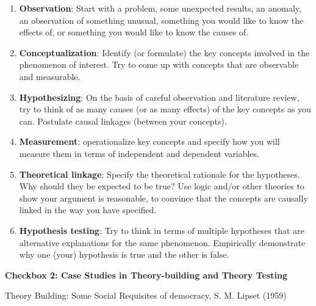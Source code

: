\documentclass{book}
\begin{document}
\begin{enumerate}
\def\labelenumi{\arabic{enumi}.}
\item
  \textbf{Observation}: Start with a problem, some unexpected results, an
  anomaly, an observation of something unusual, something you would like to
  know the effects of, or something you would like to know the causes of.
\item
  \textbf{Conceptualization}: Identify (or formulate) the key concepts
  involved in the phenomenon of interest. Try to come up with concepts that
  are observable and measurable.
\item
  \textbf{Hypothesizing}: On the basis of careful observation and literature
  review, try to think of as many causes (or as many effects) of the key
  concepts as you can. Postulate causal linkages (between your concepts).
\item
  \textbf{Measurement}: operationalize key concepts and specify how you will
  measure them in terms of independent and dependent variables.
\item
  \textbf{Theoretical linkage}: Specify the theoretical rationale for the
  hypotheses. Why should they be expected to be true? Use logic and/or other
  theories to show your argument is reasonable, to convince that the concepts
  are causally linked in the way you have specified.
\item
  \textbf{Hypothesis testing}: Try to think in terms of multiple hypotheses
  that are alternative explanations for the same phenomenon. Empirically
  demonstrate why one (your) hypothesis is true and the other is false.
\end{enumerate}

\textbf{Checkbox 2: Case Studies in Theory-building and Theory Testing}

Theory Building: Some Social Requisites of democracy, S. M. Lipset (1959)
\end{document}
